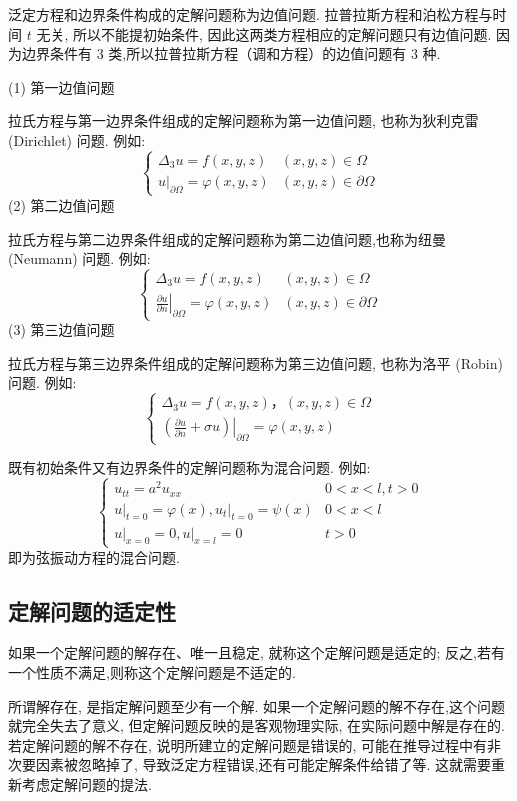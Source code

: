 泛定方程和边界条件构成的定解问题称为边值问题. 拉普拉斯方程和泊松方程与时间 $ t $ 无关, 所以不能提初始条件, 因此这两类方程相应的定解问题只有边值问题. 因为边界条件有 3 类,所以拉普拉斯方程（调和方程）的边值问题有 3 种.

(1) 第一边值问题

拉氏方程与第一边界条件组成的定解问题称为第一边值问题, 也称为狄利克雷(Dirichlet) 问题. 例如:
$$
\left\{\begin{array}{cc}
\Delta_{3} u=f(x, y, z) & (x, y, z) \in \Omega \\
\left.u\right|_{\partial \Omega}=\varphi(x, y, z) & (x, y, z) \in \partial \Omega
\end{array}\right.
$$
(2) 第二边值问题

拉氏方程与第二边界条件组成的定解问题称为第二边值问题,也称为纽曼 (Neumann) 问题. 例如:
$$
\left\{\begin{array}{cc}
\Delta_{3} u=f(x, y, z) & (x, y, z) \in \Omega \\
\left.\frac{\partial u}{\partial n}\right|_{\partial \Omega}=\varphi(x, y, z) & (x, y, z) \in \partial \Omega
\end{array}\right.
$$
(3) 第三边值问题

拉氏方程与第三边界条件组成的定解问题称为第三边值问题, 也称为洛平 (Robin) 问题. 例如:
$$
\left\{\begin{array}{l}
\Delta_{3} u=f(x, y, z)，(x, y, z) \in \Omega \\
\left.\left(\frac{\partial u}{\partial n}+\sigma u\right)\right|_{\partial \Omega}=\varphi(x, y, z)
\end{array}\right.
$$

既有初始条件又有边界条件的定解问题称为混合问题. 例如:
$$
\left\{\begin{array}{ll}
u_{t t}=a^{2} u_{x x} & 0 < x < l,  t > 0 \\
\left.u\right|_{t=0}=\varphi(x),\left.u_{t}\right|_{t=0}=\psi(x) & 0 < x < l \\
\left.u\right|_{x=0}=0,\left.u\right|_{x=l}=0 & t>0
\end{array}\right.
$$
即为弦振动方程的混合问题.

\subsection{定解问题的适定性}
如果一个定解问题的解存在、唯一且稳定, 就称这个定解问题是适定的; 反之,若有一个性质不满足,则称这个定解问题是不适定的.

所谓解存在, 是指定解问题至少有一个解. 如果一个定解问题的解不存在,这个问题就完全失去了意义, 但定解问题反映的是客观物理实际, 在实际问题中解是存在的. 若定解问题的解不存在, 说明所建立的定解问题是错误的, 可能在推导过程中有非次要因素被忽略掉了, 导致泛定方程错误,还有可能定解条件给错了等. 这就需要重新考虑定解问题的提法.

